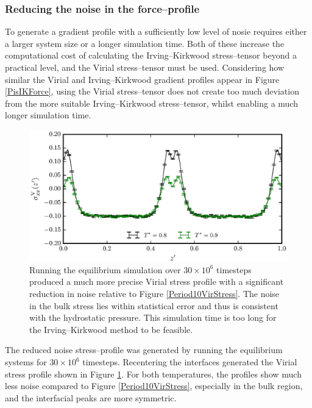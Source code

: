 \subsubsection{Reducing the noise in the force--profile}
To generate a gradient profile with a sufficiently low level of nosie requires either a larger system size or a longer simulation time.
Both of these increase the computational cost of calculating the Irving--Kirkwood stress--tensor beyond a practical level, and the Virial stress--tensor must be used.
Considering how similar the Virial and Irving--Kirkwood gradient profiles appear in Figure \ref{PisIKForce}, using the Virial stress--tensor does not create too much deviation from the more suitable Irving--Kirkwood stress--tensor, whilst enabling a much longer simulation time.
\FloatBarrier

\begin{figure}[h]
\centering
\includegraphics[scale=0.8]{Period30VirStress}
\caption{Running the equilibrium simulation over $30 \times 10^{6}$ timesteps produced a much more precise Virial stress profile with a significant reduction in noise relative to Figure \ref{Period10VirStress}.
The noise in the bulk stress lies within statistical error and thus is consistent with the hydrostatic pressure.
This simulation time is too long for the Irving--Kirkwood method to be feasible.
}
\label{Period30VirStress}
\end{figure}

The reduced noise stress--profile was generated by running the equilibrium systems for $30 \times 10^{6}$ timesteps.
Recentering the interfaces generated the Virial stress profile shown in Figure \ref{Period30VirStress}.
For both temperatures, the profiles show much less noise compared to Figure \ref{Period10VirStress}, especially in the bulk region, and the interfacial peaks are more symmetric.
\FloatBarrier

